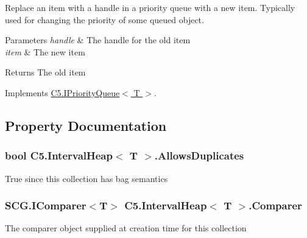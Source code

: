 Replace an item with a handle in a priority queue with a new item. Typically used for changing the priority of some queued object. 


\begin{DoxyParams}{Parameters}
{\em handle} & The handle for the old item\\
\hline
{\em item} & The new item\\
\hline
\end{DoxyParams}
\begin{DoxyReturn}{Returns}
The old item
\end{DoxyReturn}


Implements \hyperlink{interface_c5_1_1_i_priority_queue_ae5784abdd5e7b6079c4cb88dd40c34ad}{C5.\+I\+Priority\+Queue$<$ T $>$}.



\subsection{Property Documentation}
\hypertarget{class_c5_1_1_interval_heap_a3f04b4e3b21b55967adcb6cf7f3252dc}{}
\subsubsection[{Allows\+Duplicates}]{\setlength{\rightskip}{0pt plus 5cm}bool {\bf C5.\+Interval\+Heap}$<$ T $>$.Allows\+Duplicates\hspace{0.3cm}{\ttfamily [get]}}\label{class_c5_1_1_interval_heap_a3f04b4e3b21b55967adcb6cf7f3252dc}




True since this collection has bag semantics\hypertarget{class_c5_1_1_interval_heap_a0da8aaabae59ac97119bff56d16e6a87}{}
\subsubsection[{Comparer}]{\setlength{\rightskip}{0pt plus 5cm}S\+C\+G.\+I\+Comparer$<$T$>$ {\bf C5.\+Interval\+Heap}$<$ T $>$.Comparer\hspace{0.3cm}{\ttfamily [get]}}\label{class_c5_1_1_interval_heap_a0da8aaabae59ac97119bff56d16e6a87}


The comparer object supplied at creation time for this collection 

